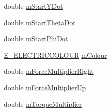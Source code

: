\begin{DoxyCompactItemize}
double \hyperlink{class_lagrangian_racer_data_a6a7c78ce9de7ffcbb33be68528e5517d}{m\-Start\-Y\-Dot}
\item 
double \hyperlink{class_lagrangian_racer_data_af212142cc23b6798c64977ca0b67fce6}{m\-Start\-Theta\-Dot}
\item 
double \hyperlink{class_lagrangian_racer_data_a5b070020860e2f56f80855f5d9156b8a}{m\-Start\-Phi\-Dot}
\item 
\hyperlink{_electric_colour_8hpp_a1979e84576b59c4d100d8a8cc41de734}{E\-\_\-\-E\-L\-E\-C\-T\-R\-I\-C\-C\-O\-L\-O\-U\-R} \hyperlink{class_lagrangian_racer_data_a3923456f0f9cd5ef72d7ac03f0a328ef}{m\-Colour}
\item 
double \hyperlink{class_lagrangian_racer_data_aee2f252fb96173df52f960d1e5d6d472}{m\-Force\-Multiplier\-Right}
\item 
double \hyperlink{class_lagrangian_racer_data_a3850b3722529380cede99e7c55630f00}{m\-Force\-Multiplier\-Up}
\item 
double \hyperlink{class_lagrangian_racer_data_ad8276c8d2a904ed4eeda7590cc12cf25}{m\-Torque\-Multiplier}
\end{DoxyCompactItemize}


